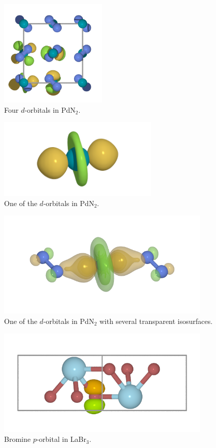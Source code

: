 \documentclass[
  notitlepage,
  twoside,
   prb,
  floatfix,
]{revtex4-1}
\begin{document}
\newpage
 \begin{figure}
 \includegraphics[width=2.0in]{figs/pdn2_1}
 \caption{Four $d$-orbitals in PdN$_2$.}
 \label{apa1}  
\end{figure}

 \begin{figure}
  \includegraphics[width=3.0in]{figs/pdn2_2}
  \caption{One of the $d$-orbitals in PdN$_2$.}
  \label{apa2}  
 \end{figure}
  
 \begin{figure}
  \includegraphics[width=4.0in]{figs/pdn2_3}
  \caption{One of the $d$-orbitals in PdN$_2$ with several transparent isosurfaces.}
  \label{apa3}  
 \end{figure}
 
 \begin{figure}
  \includegraphics[width=4.0in]{figs/labr3_1}
  \caption{Bromine $p$-orbital in LaBr$_3$.}
  \label{apa4}  
 \end{figure}
\end{document}
